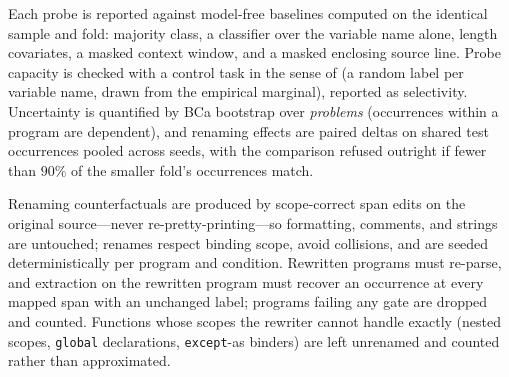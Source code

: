 Each probe is reported against model-free baselines computed on the
identical sample and fold: majority class, a classifier over the variable
name alone, length covariates, a masked context window, and a masked
enclosing source line. Probe capacity is checked with a control task in
the sense of \citet{hewitt2019control} (a random label per variable name,
drawn from the empirical marginal), reported as selectivity. Uncertainty
is quantified by BCa bootstrap over \emph{problems} (occurrences within a
program are dependent), and renaming effects are paired deltas on shared
test occurrences pooled across seeds, with the comparison refused
outright if fewer than $90\%$ of the smaller fold's occurrences match.

Renaming counterfactuals are produced by scope-correct span edits on the
original source---never re-pretty-printing---so formatting, comments, and
strings are untouched; renames respect binding scope, avoid collisions,
and are seeded deterministically per program and condition. Rewritten
programs must re-parse, and extraction on the rewritten program must
recover an occurrence at every mapped span with an unchanged label;
programs failing any gate are dropped and counted. Functions whose scopes
the rewriter cannot handle exactly (nested scopes, \texttt{global}
declarations, \texttt{except}-as binders) are left unrenamed and counted
rather than approximated.
